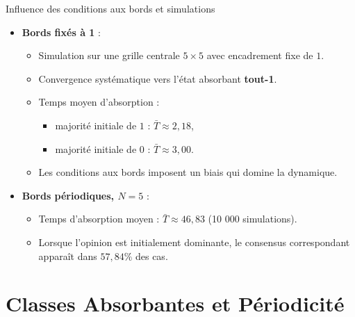 \documentclass{beamer}
\begin{document}
\begin{frame}{Influence des conditions aux bords et simulations}
\begin{itemize}
  \item \textbf{Bords fixés à 1} :
  \begin{itemize}
    \item Simulation sur une grille centrale $5 \times 5$ avec encadrement fixe de $1$.
    \item Convergence systématique vers l’état absorbant \textbf{tout-1}.
    \item Temps moyen d’absorption :
    \begin{itemize}
      \item majorité initiale de $1$ : $\bar{T} \approx 2{,}18$,
      \item majorité initiale de $0$ : $\bar{T} \approx 3{,}00$.
    \end{itemize}
    \item Les conditions aux bords imposent un biais qui domine la dynamique.
  \end{itemize}
  \item \textbf{Bords périodiques, $N=5$} :
  \begin{itemize}
    \item Temps d’absorption moyen : $\bar{T} \approx 46{,}83$ (10 000 simulations).
    \item Lorsque l’opinion est initialement dominante, le consensus correspondant apparaît dans
    $57{,}84\%$ des cas.
  \end{itemize}
\end{itemize}
\end{frame}

\section{Classes Absorbantes et Périodicité}
\end{document}

